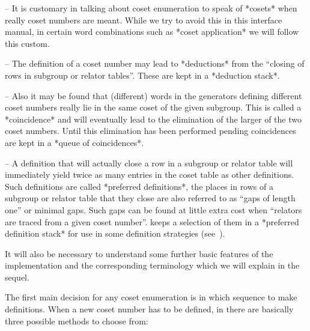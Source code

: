 \item{--} It is customary in talking about coset enumeration to  speak
of *cosets* when really coset numbers are meant. While we try to avoid
this in this interface manual, in certain word  combinations  such  as
*coset application* we will follow this custom.

\item{--} The definition of a coset number may  lead  to  *deductions*
from the ``closing of rows in subgroup or relator tables''. These  are
kept in a *deduction stack*.

\item{--}  Also  it  may  be  found  that  (different)  words  in  the
generators defining different coset numbers really  lie  in  the  same
coset of the given subgroup. This is called a *coincidence*  and  will
eventually lead to the elimination of the  larger  of  the  two  coset
numbers.  Until  this   elimination   has   been   performed   pending
coincidences are kept in a *queue of coincidences*.

\item{--} A definition that will actually close a row in a subgroup or
relator table will immediately yield twice  as  many  entries  in  the
coset  table  as  other  definitions.  Such  definitions  are   called
*preferred definitions*, the places in rows of a subgroup  or  relator
table that they close are also referred to as ``gaps of  length  one''
or minimal gaps. Such gaps can be found  at  little  extra  cost  when
``relators are traced from a given  coset  number''.  {\ACE}  keeps  a
selection of them in a *preferred definition stack* for  use  in  some
definition strategies (see~\cite{Hav91}).

\endlist

It will also be necessary to understand some further basic features of
the  implementation and  the corresponding  terminology which  we will
explain in the sequel.


The first main decision for any coset enumeration is in which sequence
to make definitions. When a new coset number has  to  be  defined,  in
{\ACE} there are basically three possible methods to choose from:


